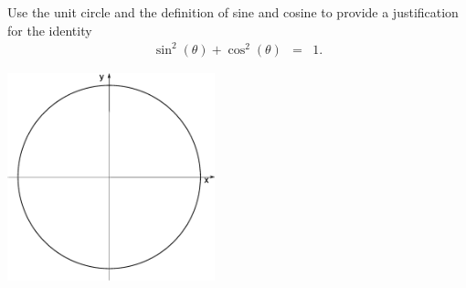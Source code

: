 
\begin{problem}
\item Use the unit circle and the definition of sine and cosine to
  provide a justification for the identity 
  \begin{eqnarray*}
    \sin^2(\theta) + \cos^2(\theta) & = & 1.
  \end{eqnarray*}

  \includegraphics[width=6cm]{trig/img/blankCircle}


\end{problem}


